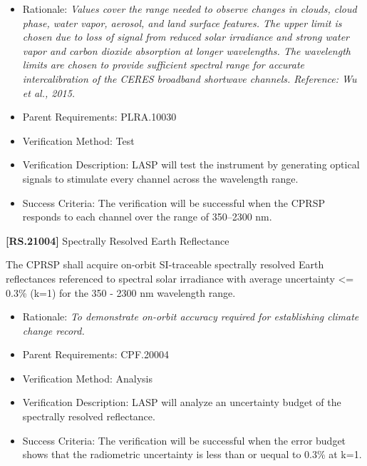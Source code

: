 \begin{itemize}
\item{} Rationale: \emph{Values cover the range needed to observe changes in clouds, cloud phase, water vapor, aerosol, and land surface features. The upper limit is chosen due to loss of signal from reduced solar irradiance and strong water vapor and carbon dioxide absorption at longer wavelengths. The wavelength limits are chosen to provide sufficient spectral range for accurate intercalibration of the CERES broadband shortwave channels. Reference: Wu et al., 2015.}

\item{} Parent Requirements: PLRA.10030

\item{} Verification Method: Test

\item{} Verification Description: \gls{LASP} will \gls{test} the instrument by generating optical signals to stimulate every channel across the wavelength range.

\item{} Success Criteria: The verification will be successful when the \gls{CPRSP} responds to each channel over the range of 350--2300 nm.

\end{itemize}

\textbf{[RS.21004]} Spectrally Resolved Earth Reflectance

The \gls{CPRSP} shall acquire on-orbit \gls{SI}-traceable spectrally resolved Earth reflectances referenced to spectral solar irradiance with average uncertainty <= 0.3\% (k=1) for the 350 - 2300 nm wavelength range.

\begin{itemize}
\item{} Rationale: \emph{To demonstrate on-orbit accuracy required for establishing climate change record.}

\item{} Parent Requirements: \gls{CPF}.20004

\item{} Verification Method: Analysis

\item{} Verification Description: \gls{LASP} will analyze an uncertainty budget of the spectrally resolved reflectance.

\item{} Success Criteria: The verification will be successful when the error budget shows that the radiometric uncertainty is less than or uequal to 0.3\% at k=1.

\end{itemize}

